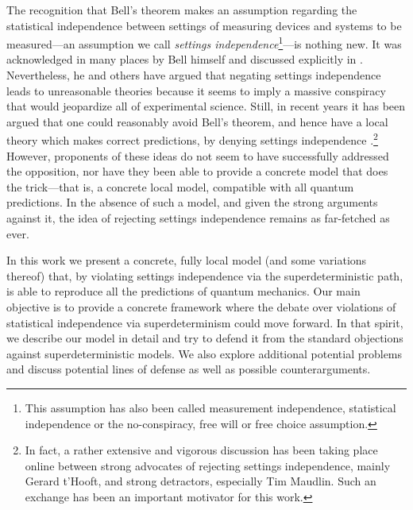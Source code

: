 \documentclass[letterpaper,12pt]{article}
\begin{document}
The recognition that Bell's theorem makes an assumption regarding the statistical independence between settings of measuring devices and systems to be measured---an assumption we call \textit{settings independence}\footnote{This assumption has also been called measurement independence, statistical independence or the no-conspiracy, free will or free choice assumption.}---is nothing new. It was acknowledged in many places by Bell himself and discussed explicitly in \cite{Bell1977}. Nevertheless, he and others have argued that negating settings independence leads to unreasonable theories because it seems to imply a massive conspiracy that would jeopardize all of experimental science. Still, in recent years it has been argued that one could reasonably avoid Bell's theorem, and hence have a local theory which makes correct predictions, by denying settings independence \cite{Hooft2016,Hooft2017,Sanchez2018,Weinstein}.\footnote{In fact, a rather extensive and vigorous discussion has been taking place online between strong advocates of rejecting settings independence, mainly Gerard t'Hooft, and strong detractors, especially Tim Maudlin. Such an exchange has been an important motivator for this work.} However, proponents of these ideas do not seem to have successfully addressed the opposition, nor have they been able to provide a concrete model that does the trick---that is, a concrete local model, compatible with all quantum predictions. In the absence of such a model, and given the strong arguments against it, the idea of rejecting settings independence remains as far-fetched as ever.

In this work we present a concrete, fully local model (and some variations thereof) that, by violating settings independence via the superdeterministic path, is able to reproduce all the predictions of quantum mechanics. Our main objective is to provide a concrete framework where the debate over violations of statistical independence via superdeterminism could move forward. In that spirit, we describe our model in detail and try to defend it from the standard objections against superdeterministic models. We also explore additional potential problems and discuss potential lines of defense as well as possible counterarguments.
\end{document}
